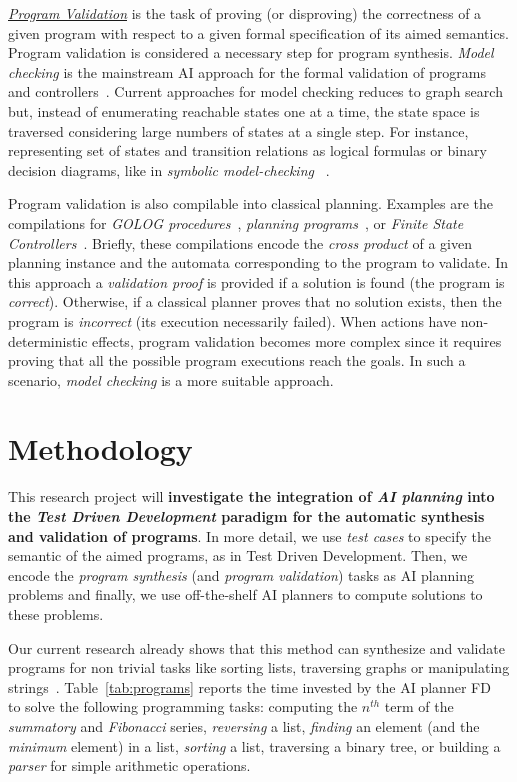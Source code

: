 \documentclass[10pt,a4paper]{paper}
\begin{document}
{\underline{\em Program Validation}} is the task of proving (or disproving) the correctness of a given program with respect to a given formal specification of its aimed semantics. Program validation is considered a necessary step for program synthesis. {\em Model checking} is the mainstream AI approach for the formal validation of programs and controllers~\cite{clarke1999model}. Current approaches for model checking reduces to graph search but, instead of enumerating reachable states one at a time, the state space is traversed considering large numbers of states at a single step. For instance, representing set of states and transition relations as logical formulas or binary decision diagrams, like in {\em symbolic model-checking} ~\cite{mcmillan1993symbolic}.

Program validation is also compilable into classical planning. Examples are the compilations for {\em {\sc GOLOG} procedures}~\cite{baier2007exploiting}, {\em planning programs}~\cite{segovia:programs:AIJ19}, or {\em Finite State Controllers}~\cite{Geffner:FSM:AAAI10,sergio:aprograming:ijcai16,segovia:FSC:JAIR2018}. Briefly, these compilations encode the {\em cross product} of a given planning instance and the automata corresponding to the program to validate. In this approach a {\em validation proof} is provided if a solution is found (the program is {\em correct}). Otherwise, if a classical planner proves that no solution exists, then the program is {\em incorrect} (its execution necessarily failed). When actions have non-deterministic effects, program validation becomes more complex since it requires proving that all the possible program executions reach the goals. In such a scenario, {\em model checking} is a more suitable approach.
\newpage

\section{Methodology}
\label{sec:methodology}
This research project will {\bf investigate the integration of {\em AI planning} into the {\em Test Driven Development} paradigm for the automatic synthesis and validation of programs}. In more detail, we use {\em test cases} to specify the semantic of the aimed programs, as in Test Driven Development. Then, we encode the {\em program synthesis} (and {\em program validation}) tasks as AI planning problems and finally, we use off-the-shelf AI planners to compute solutions to these problems.

Our current research already shows that this method can synthesize and validate programs for non trivial tasks like sorting lists, traversing graphs or manipulating strings~\cite{jimenez2015computing,sergio:aprograming:icaps16,sergio:aprogramingb:ijcai16,sergio:aprograming:ijcai16,segovia2017generating,segovia:FSC:JAIR2018,segovia:programs:AIJ19}. Table~\ref{tab:programs} reports the time invested by the AI planner {\sc FD}~\cite{helmert2006fast} to solve the following programming tasks: computing the $n^{th}$ term of the {\em summatory} and  {\em Fibonacci} series, {\em reversing} a list, {\em finding} an element (and the {\em minimum} element) in a list, {\em sorting} a list, traversing a binary tree, or building a {\em parser} for simple arithmetic operations. 
 
\end{document}

